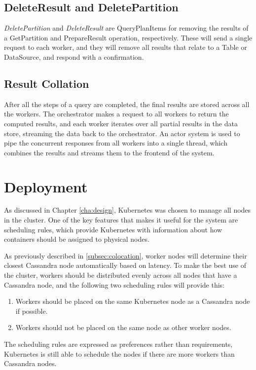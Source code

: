 \subsection{DeleteResult and DeletePartition}

\textit{DeletePartition} and \textit{DeleteResult} are QueryPlanItems for removing the results of a GetPartition and PrepareResult operation, respectively. These will send a single request to each worker, and they will remove all results that relate to a Table or DataSource, and respond with a confirmation.

\subsection{Result Collation}
After all the steps of a query are completed, the final results are stored across all the workers. The orchestrator makes a request to all workers to return the computed results, and each worker iterates over all partial results in the data store, streaming the data back to the orchestrator. An actor system is used to pipe the concurrent responses from all workers into a single thread, which combines the results and streams them to the frontend of the system.

\section{Deployment}
As discussed in Chapter \ref{cha:design}, Kubernetes was chosen to manage all nodes in the cluster. One of the key features that makes it useful for the system are scheduling rules, which provide Kubernetes with information about how containers should be assigned to physical nodes.

As previously described in \ref{subsec:colocation}, worker nodes will determine their closest Cassandra node automatically based on latency. To make the best use of the cluster, workers should be distributed evenly across all nodes that have a Cassandra node, and the following two scheduling rules will provide this:
\begin{enumerate}
	\item Workers should be placed on the same Kubernetes node as a Cassandra node if possible.
	\item Workers should not be placed on the same node as other worker nodes.
\end{enumerate}

The scheduling rules are expressed as preferences rather than requirements, Kubernetes is still able to schedule the nodes if there are more workers than Cassandra nodes.

